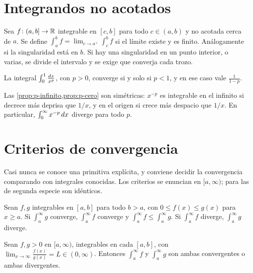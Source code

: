 \addtocounter{definicion}{1}%

\section{Integrandos no acotados}

\begin{definicion}\label{def:impropia2}
Sea $f\colon(a,b]\to\mathbb{R}$ integrable en $[c,b]$ para todo $c\in(a,b)$ y no acotada cerca de $a$. Se define $\int_a^{b}f=\lim_{c\to a^{+}}\int_c^{b}f$ si el límite existe y es finito. Análogamente si la singularidad está en $b$. Si hay una singularidad en un punto interior, o varias, se divide el intervalo y se exige que converja cada trozo.
\end{definicion}

\begin{proposicion}\label{prop:p-cero}
La integral $\int_0^{1}\frac{\mathop{}\!d x}{x^{p}}$, con $p>0$, converge si y solo si $p<1$, y en ese caso vale $\frac{1}{1-p}$.
\end{proposicion}

Las \cref{prop:p-infinito,prop:p-cero} son simétricas: $x^{-p}$ es integrable en el infinito si decrece más deprisa que $1/x$, y en el origen si crece más despacio que $1/x$. En particular, $\int_0^{\infty}x^{-p}\mathop{}\!d x$ diverge para todo $p$.

\addtocounter{definicion}{1}%

\section{Criterios de convergencia}

Casi nunca se conoce una primitiva explícita, y conviene decidir la convergencia comparando con integrales conocidas. Los criterios se enuncian en $[a,\infty)$; para las de segunda especie son idénticos.

\begin{teorema}\label{teo:comparacion-int}
Sean $f,g$ integrables en $[a,b]$ para todo $b>a$, con $0\le f(x)\le g(x)$ para $x\ge a$. Si $\int_a^{\infty}g$ converge, $\int_a^{\infty}f$ converge y $\int_a^{\infty}f\le\int_a^{\infty}g$. Si $\int_a^{\infty}f$ diverge, $\int_a^{\infty}g$ diverge.
\end{teorema}

\begin{teorema}\label{teo:comparacion-limite}
Sean $f,g>0$ en $[a,\infty)$, integrables en cada $[a,b]$, con $\lim_{x\to\infty}\frac{f(x)}{g(x)}=L\in(0,\infty)$. Entonces $\int_a^{\infty}f$ y $\int_a^{\infty}g$ son ambas convergentes o ambas divergentes.
\end{teorema}

